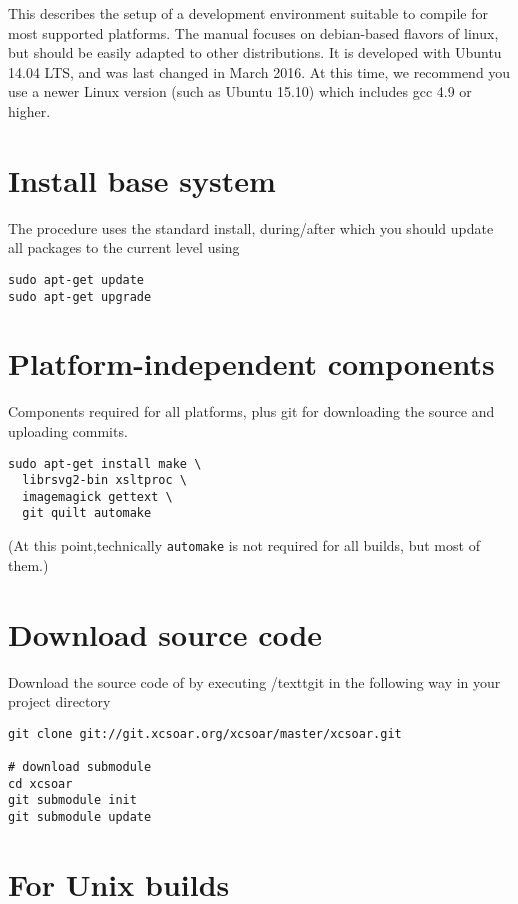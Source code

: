 This describes the setup of a development environment suitable to compile \xc for most supported platforms. The manual focuses on debian-based flavors of linux, but should be easily adapted to other distributions. It is developed with Ubuntu 14.04 LTS, and was last changed in March 2016. At this time, we recommend you use a newer Linux version (such as Ubuntu 15.10) which includes gcc 4.9 or higher.

\section{Install base system}
The procedure uses the standard install, during/after which you should update all packages to the current level using

\begin{verbatim}
sudo apt-get update
sudo apt-get upgrade
\end{verbatim}

\section{Platform-independent components}

Components required for all platforms, plus git for downloading the source and uploading commits.

\begin{verbatim}
sudo apt-get install make \
  librsvg2-bin xsltproc \
  imagemagick gettext \
  git quilt automake
\end{verbatim}
(At this point,technically  \texttt{automake} is not required for all builds, but most of them.)

\section{Download source code}

Download the source code of \xc by executing /textt{git} in the following way in your project directory
\begin{verbatim}
git clone git://git.xcsoar.org/xcsoar/master/xcsoar.git

# download submodule
cd xcsoar
git submodule init
git submodule update
\end{verbatim}


\section{For Unix builds}

